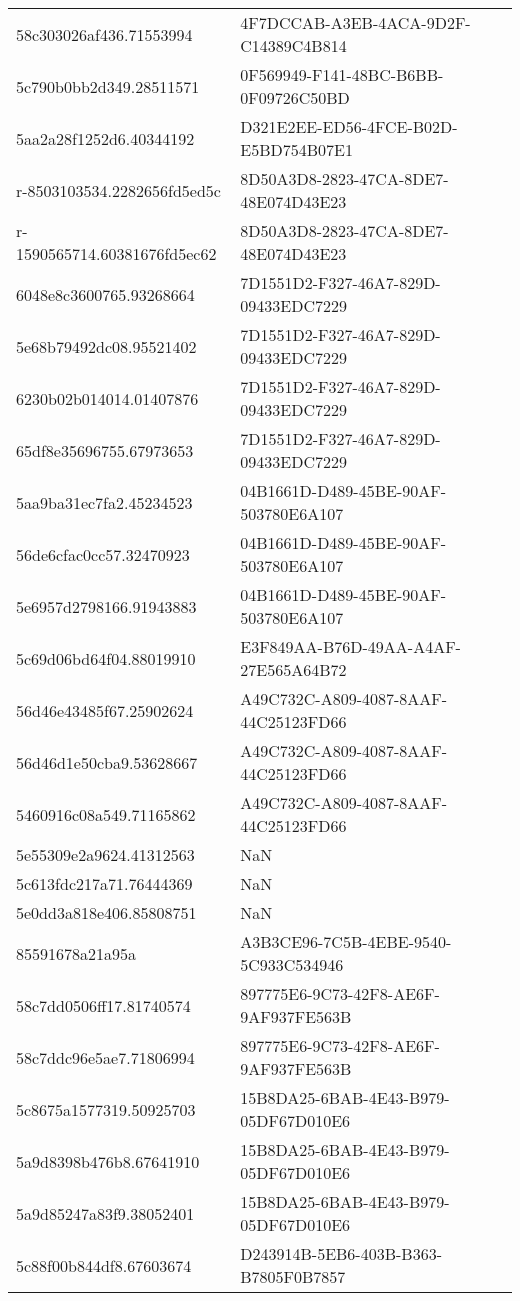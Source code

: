 \begin{tabular}{ll}
58c303026af436.71553994 & 4F7DCCAB-A3EB-4ACA-9D2F-C14389C4B814 \\
5c790b0bb2d349.28511571 & 0F569949-F141-48BC-B6BB-0F09726C50BD \\
5aa2a28f1252d6.40344192 & D321E2EE-ED56-4FCE-B02D-E5BD754B07E1 \\
r-8503103534.2282656fd5ed5c & 8D50A3D8-2823-47CA-8DE7-48E074D43E23 \\
r-1590565714.60381676fd5ec62 & 8D50A3D8-2823-47CA-8DE7-48E074D43E23 \\
6048e8c3600765.93268664 & 7D1551D2-F327-46A7-829D-09433EDC7229 \\
5e68b79492dc08.95521402 & 7D1551D2-F327-46A7-829D-09433EDC7229 \\
6230b02b014014.01407876 & 7D1551D2-F327-46A7-829D-09433EDC7229 \\
65df8e35696755.67973653 & 7D1551D2-F327-46A7-829D-09433EDC7229 \\
5aa9ba31ec7fa2.45234523 & 04B1661D-D489-45BE-90AF-503780E6A107 \\
56de6cfac0cc57.32470923 & 04B1661D-D489-45BE-90AF-503780E6A107 \\
5e6957d2798166.91943883 & 04B1661D-D489-45BE-90AF-503780E6A107 \\
5c69d06bd64f04.88019910 & E3F849AA-B76D-49AA-A4AF-27E565A64B72 \\
56d46e43485f67.25902624 & A49C732C-A809-4087-8AAF-44C25123FD66 \\
56d46d1e50cba9.53628667 & A49C732C-A809-4087-8AAF-44C25123FD66 \\
5460916c08a549.71165862 & A49C732C-A809-4087-8AAF-44C25123FD66 \\
5e55309e2a9624.41312563 & NaN \\
5c613fdc217a71.76444369 & NaN \\
5e0dd3a818e406.85808751 & NaN \\
85591678a21a95a & A3B3CE96-7C5B-4EBE-9540-5C933C534946 \\
58c7dd0506ff17.81740574 & 897775E6-9C73-42F8-AE6F-9AF937FE563B \\
58c7ddc96e5ae7.71806994 & 897775E6-9C73-42F8-AE6F-9AF937FE563B \\
5c8675a1577319.50925703 & 15B8DA25-6BAB-4E43-B979-05DF67D010E6 \\
5a9d8398b476b8.67641910 & 15B8DA25-6BAB-4E43-B979-05DF67D010E6 \\
5a9d85247a83f9.38052401 & 15B8DA25-6BAB-4E43-B979-05DF67D010E6 \\
5c88f00b844df8.67603674 & D243914B-5EB6-403B-B363-B7805F0B7857 \\

\end{tabular}
